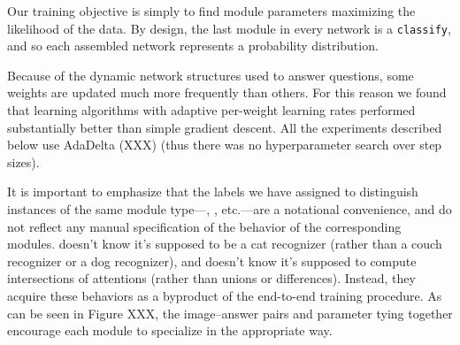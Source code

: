 Our training objective is simply to find module parameters maximizing the
likelihood of the data. By design, the last module in every network is a
{\small\tt classify}, and so each assembled network represents a probability
distribution.

Because of the dynamic network structures used to answer questions, some weights
are updated much more frequently than others. For this reason we found that
learning algorithms with adaptive per-weight learning rates performed
substantially better than simple gradient descent. All the experiments described
below use AdaDelta (XXX) (thus there was no hyperparameter search over step
sizes).

It is important to emphasize that the labels we have assigned to distinguish
instances of the same module type---, , etc.---are a
notational convenience, and do not reflect any manual specification of the
behavior of the corresponding modules.  doesn't know it's
supposed to be a cat recognizer (rather than a couch recognizer or a dog
recognizer),
and  doesn't know it's supposed to compute intersections of
attentions (rather than unions or differences). Instead, they acquire these
behaviors as a byproduct of the end-to-end training procedure. As can be seen in
Figure XXX, the image--answer pairs and parameter tying together encourage each
module to specialize in the appropriate way.
